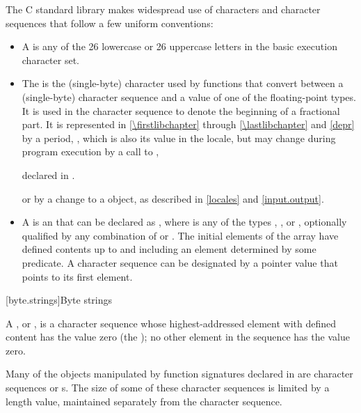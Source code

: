 \pnum
The C standard library makes widespread use
%
of characters and character sequences that follow a few uniform conventions:
\begin{itemize}
\item
A  is any of the 26 lowercase or 26
%
%
uppercase letters in the basic execution character set.
\item
The
is the
(single-byte) character used by functions that convert between a (single-byte)
character sequence and a value of one of the floating-point types.
It is used
in the character sequence to denote the beginning of a fractional part.
It is
represented in \ref{\firstlibchapter} through \ref{\lastlibchapter}
and \ref{depr} by a period,
%
,
which is
also its value in the 
locale, but may change during program
execution by a call to
,
\begin{footnote}
declared in
.
%
\end{footnote}
or by a change to a
object, as described in \ref{locales} and \ref{input.output}.
\item
A
is an   that
can be declared as
,
where  is any of the types
,
,
or
, optionally qualified by any combination of
or
.
The initial elements of the
array have defined contents up to and including an element determined by some
predicate.
A character sequence can be designated by a pointer value
 that points to its first element.
\end{itemize}

[byte.strings]{Byte strings}

%
\pnum
A ,
or \ntbs{},
is a character sequence whose highest-addressed element
with defined content has the value zero
(the );
no other element in the sequence has the value zero.
\begin{footnote}
Many of the objects manipulated by
function signatures declared in
 are character sequences or \ntbs{}s.
The size of some of these character sequences is limited by
a length value, maintained separately from the character sequence.
\end{footnote}

